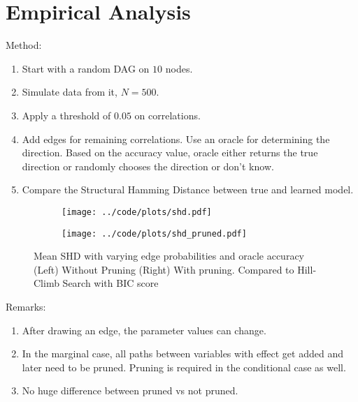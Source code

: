 \documentclass[letterpaper]{article}
\begin{document}
\section{Empirical Analysis}

Method:
\begin{enumerate}
	\item Start with a random DAG on $ 10 $ nodes.
	\item Simulate data from it, $ N = 500 $.
	\item Apply a threshold of $ 0.05 $ on correlations.
	\item Add edges for remaining correlations. Use an oracle for determining the direction. Based on the accuracy value, oracle either returns the true direction or randomly chooses the direction or don't know.
	\item Compare the Structural Hamming Distance between true and learned model.
\end{enumerate}

\begin{figure}[H]
	\begin{subfigure}{0.5 \textwidth}
		\centering
		\texttt{[image: ../code/plots/shd.pdf]}
	\end{subfigure}%
	\begin{subfigure}{0.5 \textwidth}
		\centering
		\texttt{[image: ../code/plots/shd\_pruned.pdf]}
	\end{subfigure}
		\caption{Mean SHD with varying edge probabilities and oracle accuracy (Left) Without Pruning (Right) With pruning. Compared to Hill-Climb Search with BIC score}
\end{figure}

Remarks:
\begin{enumerate}
	\item After drawing an edge, the parameter values can change.
	\item In the marginal case, all paths between variables with effect get added and later need to be pruned. Pruning is required in the conditional case as well.
	\item No huge difference between pruned vs not pruned.
\end{enumerate}
\end{document}

